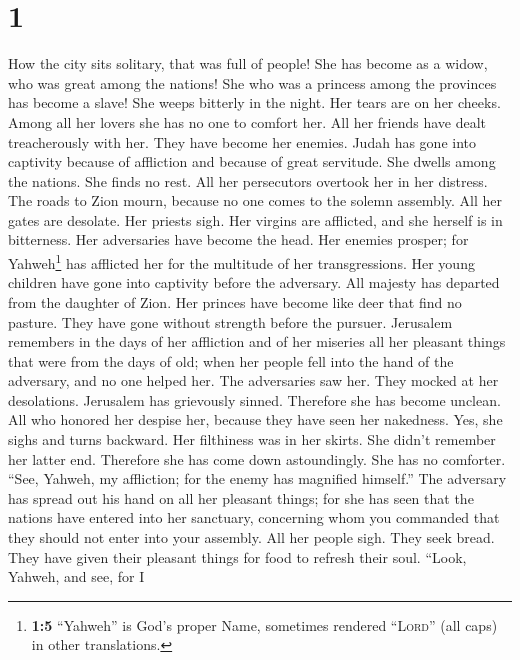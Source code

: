 \hypertarget{section}{%
\section{1}\label{section}}

 How the city sits solitary, that was full of people! She
has become as a widow, who was great among the nations! She who was a
princess among the provinces has become a slave!  She
weeps bitterly in the night. Her tears are on her cheeks. Among all her
lovers she has no one to comfort her. All her friends have dealt
treacherously with her. They have become her enemies. 
Judah has gone into captivity because of affliction and because of great
servitude. She dwells among the nations. She finds no rest. All her
persecutors overtook her in her distress.  The roads to
Zion mourn, because no one comes to the solemn assembly. All her gates
are desolate. Her priests sigh. Her virgins are afflicted, and she
herself is in bitterness.  Her adversaries have become the
head. Her enemies prosper; for Yahweh\footnote{\textbf{1:5} ``Yahweh''
  is God's proper Name, sometimes rendered ``\textsc{Lord}'' (all caps)
  in other translations.} has afflicted her for the multitude of her
transgressions. Her young children have gone into captivity before the
adversary.  All majesty has departed from the daughter of
Zion. Her princes have become like deer that find no pasture. They have
gone without strength before the pursuer.  Jerusalem
remembers in the days of her affliction and of her miseries all her
pleasant things that were from the days of old; when her people fell
into the hand of the adversary, and no one helped her. The adversaries
saw her. They mocked at her desolations.  Jerusalem has
grievously sinned. Therefore she has become unclean. All who honored her
despise her, because they have seen her nakedness. Yes, she sighs and
turns backward.  Her filthiness was in her skirts. She
didn't remember her latter end. Therefore she has come down
astoundingly. She has no comforter. ``See, Yahweh, my affliction; for
the enemy has magnified himself.''  The adversary has
spread out his hand on all her pleasant things; for she has seen that
the nations have entered into her sanctuary, concerning whom you
commanded that they should not enter into your assembly. 
All her people sigh. They seek bread. They have given their pleasant
things for food to refresh their soul. ``Look, Yahweh, and see, for I
